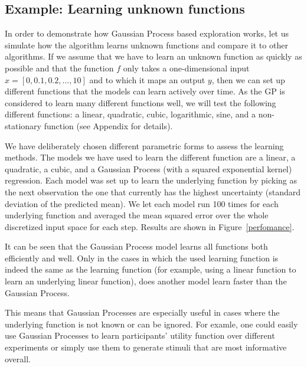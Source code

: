 \documentclass[authoryear,11pt,review]{elsarticle}
\begin{document}
\subsection{Example: Learning unknown functions}
In order to demonstrate how Gaussian Process based exploration works, let us simulate how the algorithm learns unknown functions and compare it to other algorithms. If we assume that we have to learn an unknown function as quickly as possible and that the function $f$ only takes a one-dimensional input $x=[0,0.1,0.2,\dots,10]$ and to which it maps an output $y$, then we can set up different functions that the models can learn actively over time. As the GP is considered to learn many different functions well, we will test the following different functions: a linear, quadratic, cubic, logarithmic, sine, and a non-stationary function (see Appendix for details).  

We have deliberately chosen different parametric forms to assess the learning methods. The models we have used to learn the different function are a linear, a quadratic, a cubic, and a Gaussian Process (with a squared exponential kernel) regression. Each model was set up to learn the underlying function by picking as the next observation the one that currently has the highest uncertainty (standard deviation of the predicted mean). We let each model run 100 times for each underlying function and averaged the mean squared error over the whole discretized input space for each step. Results are shown in Figure~\ref{perfomance}.

It can be seen that the Gaussian Process model learns all functions both efficiently and well. Only in the cases in which the used learning function is indeed the same as the learning function (for example, using a linear function to learn an underlying linear function), does another model learn faster than the Gaussian Process.

This means that Gaussian Processes are especially useful in cases where the underlying function is not known or can be ignored. For examle, one could easily use Gaussian Processes to learn participants' utility function over different experiments or simply use them to generate stimuli that are most informative overall. 
\end{document}
